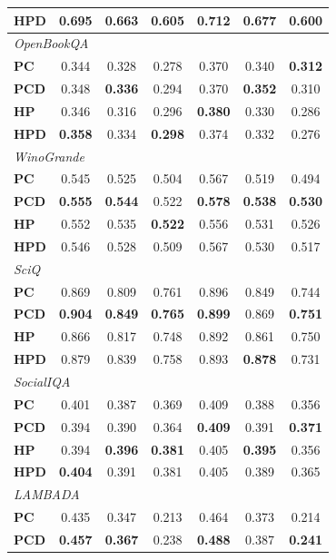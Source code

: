 \begin{table}[t!]
\begin{tabular}{lccc|ccc}
\textbf{HPD} & \textbf{0.695} & 0.663 & 0.605 & \textbf{0.712} & 0.677 & 0.600 \\
\midrule
\multicolumn{7}{l}{\textit{OpenBookQA}} \\
\textbf{PC} & 0.344 & 0.328 & 0.278 & 0.370 & 0.340 & \textbf{0.312} \\
\textbf{PCD} & 0.348 & \textbf{0.336} & 0.294 & 0.370 & \textbf{0.352} & 0.310 \\
\textbf{HP} & 0.346 & 0.316 & 0.296 & \textbf{0.380} & 0.330 & 0.286 \\
\textbf{HPD} & \textbf{0.358} & 0.334 & \textbf{0.298} & 0.374 & 0.332 & 0.276 \\
\midrule
\multicolumn{7}{l}{\textit{WinoGrande}} \\
\textbf{PC} & 0.545 & 0.525 & 0.504 & 0.567 & 0.519 & 0.494 \\
\textbf{PCD} & \textbf{0.555} & \textbf{0.544} & 0.522 & \textbf{0.578} & \textbf{0.538} & \textbf{0.530} \\
\textbf{HP} & 0.552 & 0.535 & \textbf{0.522} & 0.556 & 0.531 & 0.526 \\
\textbf{HPD} & 0.546 & 0.528 & 0.509 & 0.567 & 0.530 & 0.517 \\
\midrule
\multicolumn{7}{l}{\textit{SciQ}} \\
\textbf{PC} & 0.869 & 0.809 & 0.761 & 0.896 & 0.849 & 0.744 \\
\textbf{PCD} & \textbf{0.904} & \textbf{0.849} & \textbf{0.765} & \textbf{0.899} & 0.869 & \textbf{0.751} \\
\textbf{HP} & 0.866 & 0.817 & 0.748 & 0.892 & 0.861 & 0.750 \\
\textbf{HPD} & 0.879 & 0.839 & 0.758 & 0.893 & \textbf{0.878} & 0.731 \\
\midrule
\multicolumn{7}{l}{\textit{SocialIQA}} \\
\textbf{PC} & 0.401 & 0.387 & 0.369 & 0.409 & 0.388 & 0.356 \\
\textbf{PCD} & 0.394 & 0.390 & 0.364 & \textbf{0.409} & 0.391 & \textbf{0.371} \\
\textbf{HP} & 0.394 & \textbf{0.396} & \textbf{0.381} & 0.405 & \textbf{0.395} & 0.356 \\
\textbf{HPD} & \textbf{0.404} & 0.391 & 0.381 & 0.405 & 0.389 & 0.365 \\
\midrule
\multicolumn{7}{l}{\textit{LAMBADA}} \\
\textbf{PC} & 0.435 & 0.347 & 0.213 & 0.464 & 0.373 & 0.214 \\
\textbf{PCD} & \textbf{0.457} & \textbf{0.367} & 0.238 & \textbf{0.488} & 0.387 & \textbf{0.241} \\

\end{tabular}
\end{table}

